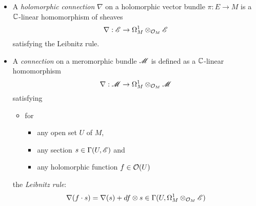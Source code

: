 \begin{defn}
  \begin{itemize}
    \item A \emph{holomorphic connection} $\nabla$ on a holomorphic vector
      bundle $\pi:E\to M$ is a $\mathbb{C}$-linear homomorphism of sheaves
      \[
        \nabla:\mathscr{E}\to\Omega_M^1\otimes_{\mathcal{O}_M}\mathscr{E}
      \]
      satisfying the Leibnitz rule.
    \item A \emph{connection} on a meromorphic bundle $\mathscr{M}$ is defined as a
      $\mathbb{C}$-linear homomorphism
      \[
        \nabla:\mathscr{M}\to\Omega_M^1\otimes_{\mathcal{O}_M}\mathscr{M}
      \]
      satisfying
      \begin{itemize}
        \item for
          \begin{itemize}
            \item any open set $U$ of $M$,
            \item any section $s\in\Gamma(U,\mathscr{E})$ and
            \item any holomorphic function $f\in\mathcal{O}(U)$
          \end{itemize}
      \end{itemize}
      the \emph{Leibnitz rule}:
      \[
        \nabla(f\cdot s)=\nabla(s)+df\otimes
        s\in\Gamma(U,\Omega_M^1\otimes_{\mathcal{O}_M}\mathscr{E})
      \]
  \end{itemize}
  \begin{comment}
    What is the difference between
    \begin{itemize}
      \item \textbf{meromorphic} bundle with \textbf{holomorphic} connection,
      \item \textbf{holomorphic} bundle with \textbf{meromorphic} connection
        and
      \item \textbf{meromorphic} bundle with \textbf{meromorphic} connection.
    \end{itemize}
  \end{comment}
\end{defn}
